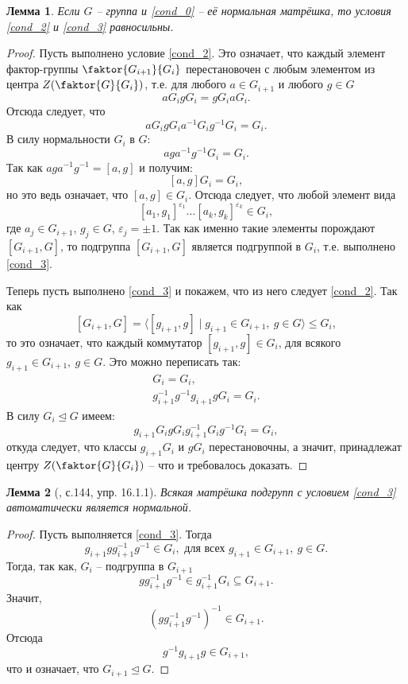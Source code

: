 \documentclass{article}
\newtheorem{lemma}{Лемма}[section]
\begin{document}
\begin{lemma}
    Если $G$ -- группа и \eqref{cond_0} -- её нормальная матрёшка, то условия \eqref{cond_2} и \eqref{cond_3} равносильны.
\end{lemma}
\begin{proof}
    Пусть выполнено условие \eqref{cond_2}. Это означает, что каждый элемент фактор-группы $\faktor{G_{i + 1}}{G_i}$ перестановочен с любым элементом из центра $Z (\faktor{G}{G_i})$, т.е. для любого $a \in G_{i + 1}$ и любого $g \in G$
    \[
        a G_i g G_i = g G_i a G_i.
    \]
    Отсюда следует, что
    \[
        a G_i g G_i a^{-1} G_i g^{-1} G_i = G_i.
    \]
    В силу нормальности $G_i$ в $G$:
    \[
        ag a^{-1} g^{-1} G_i = G_i.
    \]
    Так как $ag a^{-1} g^{-1} = [a, g]$ и получим:
    \[
        [a, g] G_i = G_i,
    \]
    но это ведь означает, что $[a, g] \in G_i$. Отсюда следует, что любой элемент вида $$ [a_1, g_1]^{\varepsilon_1} \ldots [a_k, g_k]^{\varepsilon_k} \in G_i, $$ где $a_j \in G_{i + 1}$, $g_j \in G$, $\varepsilon_j = \pm 1$. Так как именно такие элементы порождают $[G_{i + 1}, G]$, то подгруппа $[G_{i + 1}, G]$ является подгруппой в $G_i$, т.е. выполнено \eqref{cond_3}.

    Теперь пусть выполнено \eqref{cond_3} и покажем, что из него следует \eqref{cond_2}.
    Так как $$ [G_{i + 1}, G] = \langle [g_{i + 1}, g] \mid g_{i + 1} \in G_{i + 1}, \ g \in G \rangle \leqslant G_i, $$ то это означает, что каждый коммутатор $[g_{i + 1}, g] \in G_i$, для всякого $g_{i + 1} \in G_{i + 1}, \ g \in G$. Это можно переписать так:
    \begin{gather*}
        [g_{i + 1}, g] G_i = G_i, \\
        g_{i + 1}^{-1} g^{-1} g_{i+1} g G_i = G_i.
    \end{gather*}
    В силу $G_i \trianglelefteq G$ имеем:
    \[
        g_{i + 1} G_i g G_i g_{i + 1}^{-1} G_i g^{-1} G_i = G_i,
    \]
    откуда следует, что классы $g_{i + 1} G_i$ и $g G_i$ перестановочны, а значит, принадлежат центру $Z (\faktor{G}{G_i})$ -- что и требовалось доказать.
\end{proof}

\begin{lemma}[\cite{kargapolov}, с.144, упр. 16.1.1]
    Всякая матрёшка подгрупп с условием \eqref{cond_3} автоматически является нормальной.
\end{lemma}
\begin{proof}
    Пусть выполняется \eqref{cond_3}. Тогда
    \[
        g_{i + 1} g g_{i + 1}^{-1} g^{-1} \in G_i, \text{ для всех } g_{i + 1} \in G_{i + 1}, \ g \in G.
    \]
    Тогда, так как, $G_i$ -- подгруппа в $G_{i + 1}$
    \[
        g g_{i + 1}^{-1} g^{-1} \in g_{i + 1}^{-1} G_i \subseteq G_{i + 1}.
    \]
     Значит,
    \[
        (g g_{i + 1}^{-1} g^{-1})^{-1} \in G_{i + 1}.
    \]
    Отсюда
    \[
        g^{-1} g_{i + 1} g \in G_{i + 1},
    \]
    что и означает, что $G_{i + 1} \trianglelefteq G$.
\end{proof}
\end{document}
